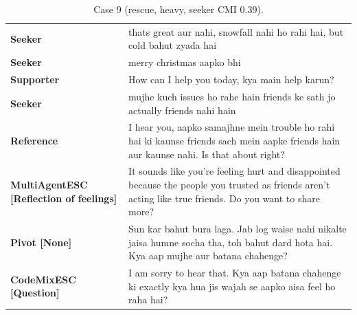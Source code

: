 \begin{table}[t]
\centering\footnotesize
\caption{Case 9 (rescue, heavy, seeker CMI 0.39).}
\label{tab:case9}
\begin{tabular}{@{}p{}p{}@{}}
\toprule
\textbf{Seeker} & thats great aur nahi, snowfall nahi ho rahi hai, but cold bahut zyada hai \\
\textbf{Seeker} & merry christmas aapko bhi \\
\textbf{Supporter} & How can I help you today, kya main help karun? \\
\textbf{Seeker} & mujhe kuch issues ho rahe hain friends ke sath jo actually friends nahi hain \\
\textbf{Reference} & I hear you, aapko samajhne mein trouble ho rahi hai ki kaunse friends sach mein aapke friends hain aur kaunse nahi. Is that about right? \\
\textbf{MultiAgentESC [Reflection of feelings]} & It sounds like you're feeling hurt and disappointed because the people you trusted as friends aren't acting like true friends. Do you want to share more? \\
\textbf{Pivot [None]} & Sun kar bahut bura laga. Jab log waise nahi nikalte jaisa humne socha tha, toh bahut dard hota hai. Kya aap mujhe aur batana chahenge? \\
\textbf{CodeMixESC [Question]} & I am sorry to hear that. Kya aap batana chahenge ki exactly kya hua jis wajah se aapko aisa feel ho raha hai? \\
\bottomrule
\end{tabular}
\end{table}


